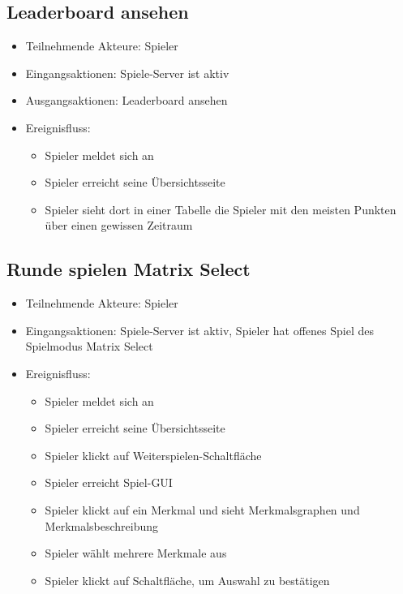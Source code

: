\documentclass[a4paper]{scrreprt}
\begin{document}
    \subsection{Leaderboard ansehen}
    \begin{itemize}
        \item Teilnehmende Akteure: \Gls{Spieler}
        \item Eingangsaktionen: Spiele-Server ist aktiv
        \item Ausgangsaktionen: Leaderboard ansehen
        \item Ereignisfluss:
        \begin{itemize}
            \item Spieler meldet sich an
            \item Spieler erreicht seine Übersichtsseite
            \item Spieler sieht dort in einer Tabelle die Spieler mit den meisten Punkten über einen gewissen Zeitraum
        \end{itemize}
    \end{itemize}
    
    \subsection{Runde spielen Matrix Select}
    \begin{itemize}
    	\item Teilnehmende Akteure: \Gls{Spieler}
    	\item Eingangsaktionen: Spiele-Server ist aktiv, Spieler hat offenes Spiel des Spielmodus Matrix Select
    	\item Ereignisfluss:
    	\begin{itemize}
    		\item Spieler meldet sich an
    		\item Spieler erreicht seine Übersichtsseite
    		\item Spieler klickt auf Weiterspielen-Schaltfläche
    		\item Spieler erreicht Spiel-GUI
    		\item Spieler klickt auf ein Merkmal und sieht Merkmalsgraphen und Merkmalsbeschreibung
    		\item Spieler wählt mehrere Merkmale aus
    		\item Spieler klickt auf Schaltfläche, um Auswahl zu bestätigen 
    	\end{itemize}
    \end{itemize}
	
\end{document}
